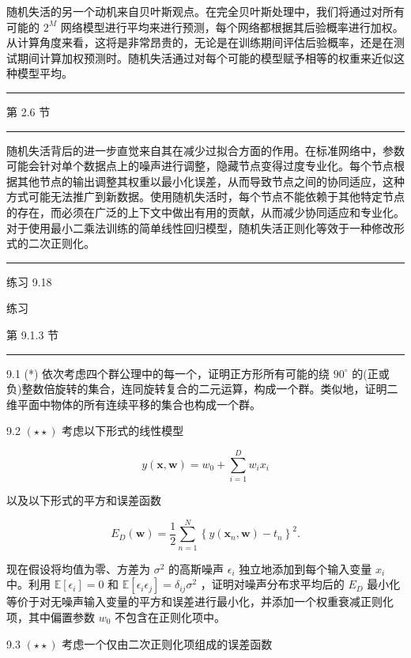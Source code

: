 \documentclass[10pt]{article}
\newcommand{\HRule}{\begin{center}\rule{0.9\linewidth}{0.2mm}\end{center}}
\begin{document}
随机失活的另一个动机来自贝叶斯观点。在完全贝叶斯处理中，我们将通过对所有可能的 \({2}^{M}\) 网络模型进行平均来进行预测，每个网络都根据其后验概率进行加权。从计算角度来看，这将是非常昂贵的，无论是在训练期间评估后验概率，还是在测试期间计算加权预测时。随机失活通过对每个可能的模型赋予相等的权重来近似这种模型平均。

\HRule

第 2.6 节

\HRule

随机失活背后的进一步直觉来自其在减少过拟合方面的作用。在标准网络中，参数可能会针对单个数据点上的噪声进行调整，隐藏节点变得过度专业化。每个节点根据其他节点的输出调整其权重以最小化误差，从而导致节点之间的协同适应，这种方式可能无法推广到新数据。使用随机失活时，每个节点不能依赖于其他特定节点的存在，而必须在广泛的上下文中做出有用的贡献，从而减少协同适应和专业化。对于使用最小二乘法训练的简单线性回归模型，随机失活正则化等效于一种修改形式的二次正则化。

\HRule

练习 9.18

练习

第 9.1.3 节

\HRule

9.1 (*) 依次考虑四个群公理中的每一个，证明正方形所有可能的绕 \({90}^{ \circ  }\) 的(正或负)整数倍旋转的集合，连同旋转复合的二元运算，构成一个群。类似地，证明二维平面中物体的所有连续平移的集合也构成一个群。

9.2 \(\left( {\star  \star  }\right)\) 考虑以下形式的线性模型

\[
y\left( {\mathbf{x},\mathbf{w}}\right)  = {w}_{0} + \mathop{\sum }\limits_{{i = 1}}^{D}{w}_{i}{x}_{i} \tag{9.52}
\]

以及以下形式的平方和误差函数

\[
{E}_{D}\left( \mathbf{w}\right)  = \frac{1}{2}\mathop{\sum }\limits_{{n = 1}}^{N}{\left\{  y\left( {\mathbf{x}}_{n},\mathbf{w}\right)  - {t}_{n}\right\}  }^{2}. \tag{9.53}
\]

现在假设将均值为零、方差为 \({\sigma }^{2}\) 的高斯噪声 \({\epsilon }_{i}\) 独立地添加到每个输入变量 \({x}_{i}\) 中。利用 \(\mathbb{E}\left\lbrack  {\epsilon }_{i}\right\rbrack   = 0\) 和 \(\mathbb{E}\left\lbrack  {{\epsilon }_{i}{\epsilon }_{j}}\right\rbrack   = {\delta }_{ij}{\sigma }^{2}\) ，证明对噪声分布求平均后的 \({E}_{D}\) 最小化等价于对无噪声输入变量的平方和误差进行最小化，并添加一个权重衰减正则化项，其中偏置参数 \({w}_{0}\) 不包含在正则化项中。

9.3 \(\left( {\star  \star  }\right)\) 考虑一个仅由二次正则化项组成的误差函数
\end{document}
